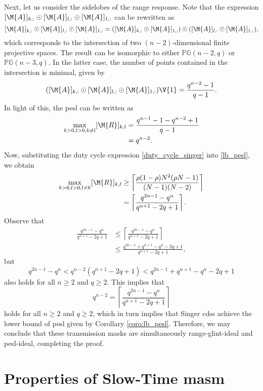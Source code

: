 \documentclass[journal,a4paper,10pt, romanappendices]{IEEEtran}
\begin{document}
\begin{IEEEproof}
Next, let us consider the sidelobes of the range response. Note that the expression $[\M{A}]_{k,:} \odot [\M{A}]_{l,:} \odot [\M{A}]_{1,:}$ can be rewritten as
$$
[\M{A}]_{k,:} \odot [\M{A}]_{l,:} \odot [\M{A}]_{1,:} = ([\M{A}]_{k,:} \odot [\M{A}]_{1,:}) \odot ([\M{A}]_{l,:} \odot [\M{A}]_{1,:}),
$$
which corresponds to the intersection of two $(n-2)$-dimensional finite projective spaces. The result can be isomorphic to either $\mathbb{PG}(n-2,q)$ or $\mathbb{PG}(n-3,q)$. In the latter case, the number of points contained in the intersection is minimal, given by
$$
([\M{A}]_{k,:} \odot [\M{A}]_{l,:} \odot [\M{A}]_{1,:})\V{1} = \frac{q^{n-2}-1}{q-1}.
$$
In light of this, the \ac{pesl} can be written as
$$
\begin{aligned}
\max_{k>0,l>0,k\neq l} [\M{R}]_{k,l} &=\frac{q^{n-1}-1-q^{n-2}+1}{q-1}\\
&= q^{n-2}.
\end{aligned}
$$
Now, substituting the duty cycle expression \eqref{duty_cycle_singer} into \eqref{lb_pesl}, we obtain
\begin{align}
\max_{k>0,l>0,l\neq k} [\M{R}]_{k,l}&\geq \left\lceil\frac{\rho(1-\rho)N^2(\rho N-1)}{(N-1)(N-2)}\right\rceil \nonumber\\
&=\left\lceil\frac{q^{2n-1}-q^n}{q^{n+1}-2q+1}\right\rceil.
\end{align}
Observe that
\begin{align}\label{bounds_pesl}
\frac{q^{2n-1}-q^n}{q^{n+1}-2q+1}&\leq \left\lceil\frac{q^{2n-1}-q^n}{q^{n+1}-2q+1}\right\rceil \nonumber\\
&\leq \frac{q^{2n-1}+q^{n+1}-q^n-2q+1}{q^{n+1}-2q+1},
\end{align}
but
$$
q^{2n-1}-q^n < q^{n-2}(q^{n+1}-2q+1) < q^{2n-1}+q^{n+1}-q^n-2q+1
$$
also holds for all $n\geq 2$ and $q\geq 2$. This implies that 
\begin{equation}
q^{n-2} = \left\lceil\frac{q^{2n-1}-q^n}{q^{n+1}-2q+1}\right\rceil
\end{equation}
holds for all $n\geq 2$ and $q\geq 2$, which in turn implies that Singer \acp{cds} achieve the lower bound of \ac{pesl} given by Corollary \ref{coro:lb_pesl}. Therefore, we may conclude that these transmission masks are simultaneously range-glint-ideal and \ac{pesl}-ideal, completing the proof.
\end{IEEEproof}

\section{Properties of Slow-Time \ac{masm}}
\end{document}
